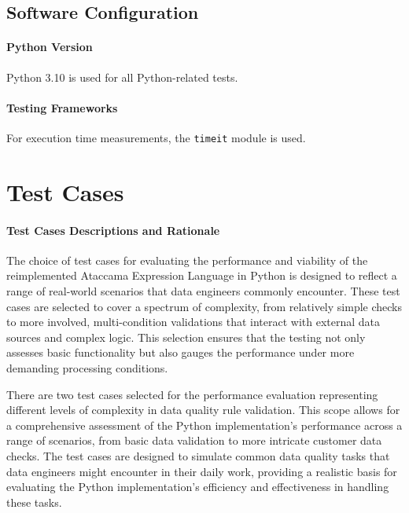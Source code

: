     \subsection{Software Configuration}

    \paragraph{Python Version} Python 3.10 is used for all Python-related tests.
    
    \paragraph{Testing Frameworks} For execution time measurements, the \texttt{timeit} module is used.
   

\section{Test Cases}


\paragraph{Test Cases Descriptions and Rationale}

The choice of test cases for evaluating the performance and viability of the reimplemented Ataccama Expression Language in Python is designed to reflect a range of real-world scenarios that data engineers commonly encounter. These test cases are selected to cover a spectrum of complexity, from relatively simple checks to more involved, multi-condition validations that interact with external data sources and complex logic. This selection ensures that the testing not only assesses basic functionality but also gauges the performance under more demanding processing conditions. 

There are two test cases selected for the performance evaluation representing different levels of complexity in data quality rule validation. This scope allows for a comprehensive assessment of the Python implementation's performance across a range of scenarios, from basic data validation to more intricate customer data checks. The test cases are designed to simulate common data quality tasks that data engineers might encounter in their daily work, providing a realistic basis for evaluating the Python implementation's efficiency and effectiveness in handling these tasks.

